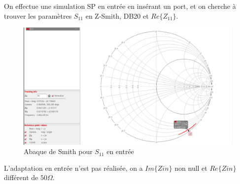 \documentclass[a4paper]{article}
\begin{document}
On effectue une simulation SP en entr\'ee en ins\'erant un port, et on cherche \`a trouver les
param\`etres $S_{11}$ en Z-Smith, DB20 et $Re\{Z_{11}\}$.

\begin{figure}[!htb]
\begin{center}
  \includegraphics[width=\linewidth]{Q2-S11-Smith-notadapted.png}
  \caption{Abaque de Smith pour $S_{11}$ en entr\'ee }
  \label{S11-nonadapted}
\end{center}
\end{figure}

L'adaptation en entr\'ee n'est pas r\'ealis\'ee, on a $Im\{Zin\}$ non null et $Re\{Zin\}$ diff\'erent de $50 \Omega$.
\clearpage
\end{document}
